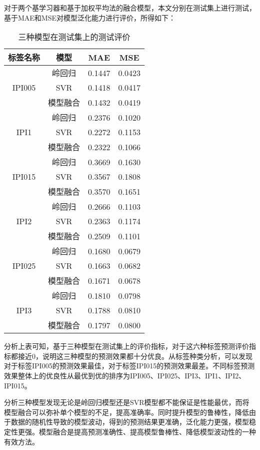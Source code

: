 对于两个基学习器和基于加权平均法的融合模型，本文分别在测试集上进行测试，基于MAE和MSE对模型泛化能力进行评价，所得如下：

\begin{table}[H]
	\centering  
	\caption{三种模型在测试集上的测试评价}
	\begin{tabular}{c c c c}  
		\toprule[1.5pt]  
		标签名称 & 模型 & MAE & MSE  \\  
		\midrule[1pt]    
		\multirow{3}{*}{IPI005} & 岭回归   & 0.1447	& 0.0423    \\ 
		& SVR      & 0.1418	& 0.0417    \\
		& 模型融合 & 0.1432	& 0.0419    \\
		\multirow{3}{*}{IPI1}   & 岭回归   & 0.2376	& 0.1020    \\ 
		& SVR      & 0.2272	& 0.1153    \\
		& 模型融合 & 0.2322	& 0.1066    \\
		\multirow{3}{*}{IPI015} & 岭回归   & 0.3669	& 0.1630	\\ 
		& SVR      & 0.3567	& 0.1808	\\
		& 模型融合 & 0.3570	& 0.1651	\\
		\multirow{3}{*}{IPI2}   & 岭回归   & 0.2666	& 0.1103	\\ 
		& SVR      & 0.2363	& 0.1174	\\
		& 模型融合 & 0.2509	& 0.1101	\\
		\multirow{3}{*}{IPI025} & 岭回归   & 0.1680	& 0.0679	\\ 
		& SVR      & 0.1663	& 0.0682	\\
		& 模型融合 & 0.1671	& 0.0678	\\
		\multirow{3}{*}{IPI3}   & 岭回归   & 0.1810	& 0.0798	\\ 
		& SVR      & 0.1788	& 0.0810	\\
		& 模型融合 & 0.1797	& 0.0800    \\
		\toprule[1.5pt]  
	\end{tabular}  
\end{table} 

分析上表可知，基于三种模型在测试集上的评价指标，对于这六种标签预测评价指标都接近0，说明这三种模型的预测效果都十分优良。从标签种类分析，可以发现对于标签IPI005的预测效果最佳，对于标签IPI015的预测效果最差。不同标签预测效果整体上的优良性从最优到优的排序为IPI005、IPI025、IPI3、IPI1、IPI2、IPI015。

分析三种模型发现无论是岭回归模型还是SVR模型都不能保证是性能最优，而将模型融合可以弥补单个模型的不足，提高准确率。同时提升模型的鲁棒性，降低由于数据的随机性导致的模型波动，得到的预测结果更准确，泛化能力更强，模型稳定性更强。模型融合是提高预测准确性、提高模型鲁棒性、降低模型波动性的一种有效方法。



